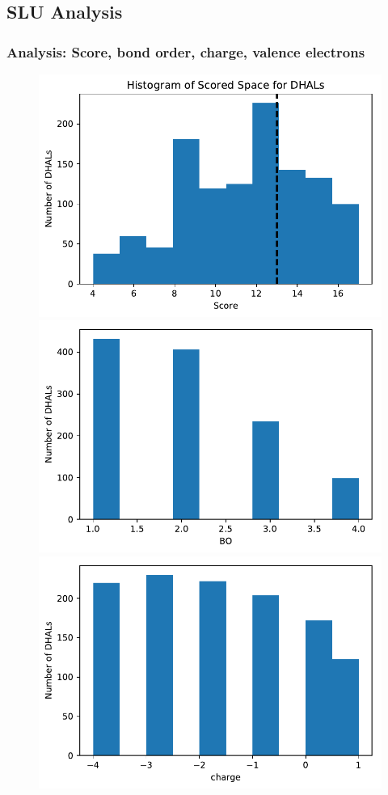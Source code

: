 \documentclass[xcolor=dvipsnames]{beamer}
\begin{document}
\subsection{SLU Analysis}

\begin{frame}
\frametitle{Analysis: Score, bond order, charge, valence electrons}
\begin{figure}[ht] 
	\begin{minipage}[b]{0.5\linewidth}
		\centering
		\includegraphics[width=.8\linewidth]{img/dhal_ss_hist.pdf} 
		\vspace{2ex}
	\end{minipage}%
	\begin{minipage}[b]{0.5\linewidth}
		\centering
		\includegraphics[width=.8\linewidth]{img/dhal_ss_hist_bo.pdf} 
		\vspace{2ex}
	\end{minipage} 
	\begin{minipage}[b]{0.5\linewidth}
		\centering
		\includegraphics[width=.8\linewidth]{img/dhal_ss_hist_charge.pdf} 

\end{minipage}
\end{figure}
\end{frame}
\end{document}
